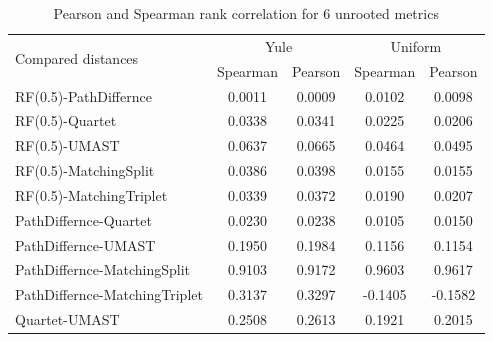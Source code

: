 \begin{table}[htbp]
\centering
\caption{Pearson and Spearman rank correlation for 6 unrooted metrics}
\label{tab:correlations}
\begin{tabular}{lcccc}
\toprule
\multirow{2}{*}{Compared distances} & \multicolumn{2}{c}{Yule} & \multicolumn{2}{c}{Uniform} \\
& Spearman & Pearson & Spearman & Pearson \\
\midrule
RF(0.5)-PathDiffernce & \cellcolor[rgb]{0.00,1.00,0.00}0.0011 & \cellcolor[rgb]{0.00,1.00,0.00}0.0009 & \cellcolor[rgb]{0.01,0.99,0.00}0.0102 & \cellcolor[rgb]{0.01,0.99,0.00}0.0098 \\
RF(0.5)-Quartet & \cellcolor[rgb]{0.03,0.97,0.00}0.0338 & \cellcolor[rgb]{0.03,0.97,0.00}0.0341 & \cellcolor[rgb]{0.02,0.98,0.00}0.0225 & \cellcolor[rgb]{0.02,0.98,0.00}0.0206 \\
RF(0.5)-UMAST & \cellcolor[rgb]{0.06,0.94,0.00}0.0637 & \cellcolor[rgb]{0.07,0.93,0.00}0.0665 & \cellcolor[rgb]{0.05,0.95,0.00}0.0464 & \cellcolor[rgb]{0.05,0.95,0.00}0.0495 \\
RF(0.5)-MatchingSplit & \cellcolor[rgb]{0.04,0.96,0.00}0.0386 & \cellcolor[rgb]{0.04,0.96,0.00}0.0398 & \cellcolor[rgb]{0.02,0.98,0.00}0.0155 & \cellcolor[rgb]{0.02,0.98,0.00}0.0155 \\
RF(0.5)-MatchingTriplet & \cellcolor[rgb]{0.03,0.97,0.00}0.0339 & \cellcolor[rgb]{0.04,0.96,0.00}0.0372 & \cellcolor[rgb]{0.02,0.98,0.00}0.0190 & \cellcolor[rgb]{0.02,0.98,0.00}0.0207 \\
PathDiffernce-Quartet & \cellcolor[rgb]{0.02,0.98,0.00}0.0230 & \cellcolor[rgb]{0.02,0.98,0.00}0.0238 & \cellcolor[rgb]{0.01,0.99,0.00}0.0105 & \cellcolor[rgb]{0.01,0.98,0.00}0.0150 \\
PathDiffernce-UMAST & \cellcolor[rgb]{0.20,0.80,0.00}0.1950 & \cellcolor[rgb]{0.20,0.80,0.00}0.1984 & \cellcolor[rgb]{0.12,0.88,0.00}0.1156 & \cellcolor[rgb]{0.12,0.88,0.00}0.1154 \\
PathDiffernce-MatchingSplit & \cellcolor[rgb]{0.91,0.09,0.00}0.9103 & \cellcolor[rgb]{0.92,0.08,0.00}0.9172 & \cellcolor[rgb]{0.96,0.04,0.00}0.9603 & \cellcolor[rgb]{0.96,0.04,0.00}0.9617 \\
PathDiffernce-MatchingTriplet & \cellcolor[rgb]{0.31,0.69,0.00}0.3137 & \cellcolor[rgb]{0.33,0.67,0.00}0.3297 & \cellcolor[rgb]{-0.14,1.14,0.00}-0.1405 & \cellcolor[rgb]{-0.16,1.16,0.00}-0.1582 \\
Quartet-UMAST & \cellcolor[rgb]{0.25,0.75,0.00}0.2508 & \cellcolor[rgb]{0.26,0.74,0.00}0.2613 & \cellcolor[rgb]{0.19,0.81,0.00}0.1921 & \cellcolor[rgb]{0.20,0.80,0.00}0.2015 \\

\end{tabular}
\end{table}
